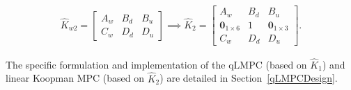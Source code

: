 \begin{align*} 
    \hat{K}_{w2} = \left[\begin{array}{c|cc} 
        A_w & B_d & B_u\\ 
        \hline 
        C_w & D_d & D_u 
    \end{array}\right] \implies
    \hat{K}_{2} = \left[\begin{array}{cc|c} 
        A_w & B_d & B_u\\ 
        \bm{0}_{1\times6} & 1 & \bm{0}_{1\times3}\\
        \hline 
        C_w & D_d & D_u 
    \end{array}\right].
\end{align*}

The specific formulation and implementation of the qLMPC (based on $\hat{K}_1$) and linear Koopman MPC (based on $\hat{K}_2$) are detailed in Section~\ref{qLMPCDesign}.